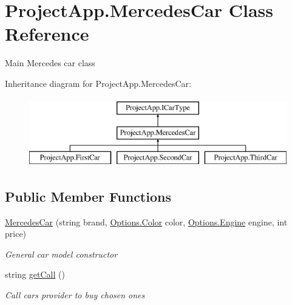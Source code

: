 \hypertarget{class_project_app_1_1_mercedes_car}{}\section{Project\+App.\+Mercedes\+Car Class Reference}
\label{class_project_app_1_1_mercedes_car}


Main Mercedes car class  


Inheritance diagram for Project\+App.\+Mercedes\+Car\+:\begin{figure}[H]
\begin{center}
\leavevmode
\includegraphics[height=3.000000cm]{class_project_app_1_1_mercedes_car}
\end{center}
\end{figure}
\subsection*{Public Member Functions}
\begin{DoxyCompactItemize}
\item 
\mbox{\hyperlink{class_project_app_1_1_mercedes_car_ad497ef3e7b586d22124c25240ed84dfc}{Mercedes\+Car}} (string brand, \mbox{\hyperlink{class_project_app_1_1_options_aaa68b08af20deeebf73e6bc6de725c44}{Options.\+Color}} color, \mbox{\hyperlink{class_project_app_1_1_options_a95e313182e8122da719f7c8caefcc88d}{Options.\+Engine}} engine, int price)
\begin{DoxyCompactList}\small\item\em General car model constructor \end{DoxyCompactList}\item 
string \mbox{\hyperlink{class_project_app_1_1_mercedes_car_a32e1e3a3c58891b905451d3d1dc84c7b}{get\+Call}} ()
\begin{DoxyCompactList}\small\item\em Call cars provider to buy chosen ones \end{DoxyCompactList}\end{DoxyCompactItemize}
